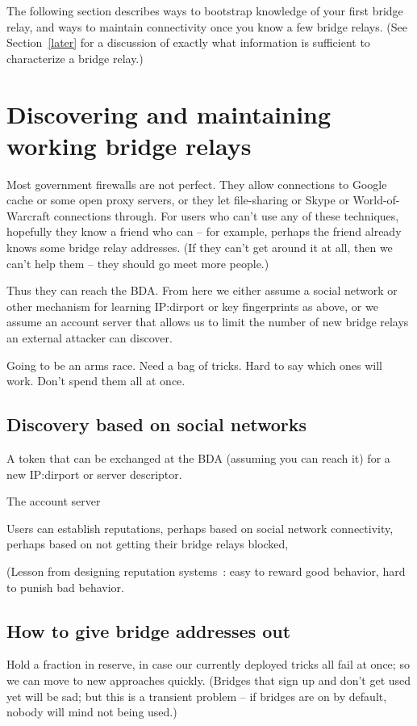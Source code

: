 \documentclass{llncs}
\begin{document}
The following section describes ways to bootstrap knowledge of your first
bridge relay, and ways to maintain connectivity once you know a few
bridge relays. (See Section~\ref{later} for a discussion of exactly
what information is sufficient to characterize a bridge relay.)

\section{Discovering and maintaining working bridge relays}

Most government firewalls are not perfect. They allow connections to
Google cache or some open proxy servers, or they let file-sharing or
Skype or World-of-Warcraft connections through.
For users who can't use any of these techniques, hopefully they know
a friend who can -- for example, perhaps the friend already knows some
bridge relay addresses.
(If they can't get around it at all, then we can't help them -- they
should go meet more people.)

Thus they can reach the BDA. From here we either assume a social
network or other mechanism for learning IP:dirport or key fingerprints
as above, or we assume an account server that allows us to limit the
number of new bridge relays an external attacker can discover.

Going to be an arms race. Need a bag of tricks. Hard to say
which ones will work. Don't spend them all at once.

\subsection{Discovery based on social networks}

A token that can be exchanged at the BDA (assuming you
can reach it) for a new IP:dirport or server descriptor.

The account server

Users can establish reputations, perhaps based on social network
connectivity, perhaps based on not getting their bridge relays blocked,

(Lesson from designing reputation systems~\cite{p2p-econ}: easy to
reward good behavior, hard to punish bad behavior.

\subsection{How to give bridge addresses out}

Hold a fraction in reserve, in case our currently deployed tricks
all fail at once; so we can move to new approaches quickly.
(Bridges that sign up and don't get used yet will be sad; but this
is a transient problem -- if bridges are on by default, nobody will
mind not being used.)
\end{document}
